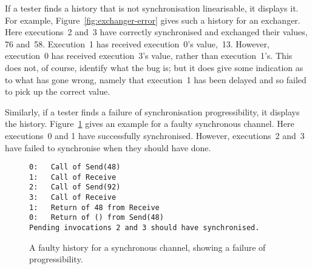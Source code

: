
If a tester finds a history that is not synchronisation linearisable, it
displays it.  For example, Figure~\ref{fig:exchanger-error} gives such a
history for an exchanger.  Here executions~2 and~3 have correctly synchronised
and exchanged their values, 76 and~58.  Execution~1 has received execution~0's
value,~13.  However, execution~0 has received execution~3's value, rather than
execution~1's.  This does not, of course, identify what the bug is; but it does
give some indication as to what has gone wrong, namely that execution~1 has been
delayed and so failed to pick up the correct value. 

Similarly, if a tester finds a failure of synchronisation progressibility, it
displays the history.  Figure~\ref{fig:progress-error} gives an example for a
faulty synchronous channel.  Here executions~0 and 1 have successfully
synchronised.  However, executions~2 and~3 have failed to synchronise when
they should have done.


\begin{figure}
\begin{verbatim}
0:   Call of Send(48)
1:   Call of Receive
2:   Call of Send(92)
3:   Call of Receive
1:   Return of 48 from Receive
0:   Return of () from Send(48)
Pending invocations 2 and 3 should have synchronised.
\end{verbatim}
\caption{A faulty history for a synchronous channel, showing a failure of
  progressibility.}
\label{fig:progress-error}
\end{figure}
